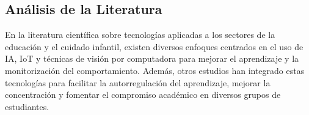 \documentclass[a4paper,fleqn]{cas-sc}
\begin{document}
		
		
		
		
		
		\subsection{Análisis de la Literatura}			
			En la literatura científica sobre tecnologías aplicadas a los sectores de la educación y el cuidado infantil, existen diversos enfoques centrados en el uso de IA, IoT y técnicas de visión por computadora para mejorar el aprendizaje y la monitorización del comportamiento. Además, otros estudios han integrado estas tecnologías para facilitar la autorregulación del aprendizaje, mejorar la concentración y fomentar el compromiso académico en diversos grupos de estudiantes.
			
\end{document}
